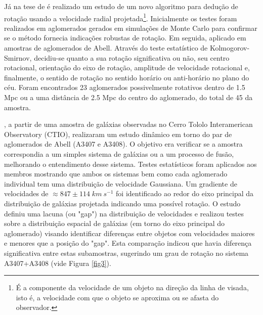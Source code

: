 Já na tese de  é realizado um estudo de um novo algoritmo para dedução de rotação usando a velocidade radial projetada\footnote{É a componente da velocidade de um objeto na direção da linha de visada, isto é, a velocidade com que o objeto se aproxima ou se afasta do observador.}. Inicialmente os testes foram realizados em aglomerados gerados em simulações de Monte Carlo para confirmar se o método fornecia indicações robustas de rotação. Em seguida, aplicado em amostras de aglomerados de Abell. Através do teste estatístico de Kolmogorov-Smirnov, decidiu-se quanto a sua rotação significativa ou não, seu centro rotacional, orientação do eixo de rotação, amplitude de velocidade rotacional e, finalmente, o sentido de rotação no sentido horário ou anti-horário no plano do céu. Foram encontrados 23 aglomerados possivelmente rotativos dentro de 1.5 Mpc ou a uma distância de 2.5 Mpc do centro do aglomerado, do total de 45 da amostra.

, a partir de uma amostra de galáxias observadas no Cerro Tololo Interamerican Observatory (CTIO), realizaram um estudo dinâmico em torno do par de aglomerados de Abell (A3407 e A3408). O objetivo era verificar se a amostra correspondia a um simples sistema de galáxias ou a um processo de fusão, melhorando o entendimento desse sistema. Testes estatísticos foram aplicados aos membros mostrando que ambos os sistemas bem como cada aglomerado individual tem uma distribuição de velocidade Gaussiana. Um gradiente de velocidades de $\approx 847 \pm 114\; {km~s^{-1}}$ foi identificado ao redor do eixo principal da distribuição de galáxias projetada indicando uma possível rotação. 
O estudo definiu uma lacuna (ou "gap") na distribuição de velocidades e realizou testes sobre a distribuição espacial de galáxias (em torno do eixo principal do aglomerado) visando identificar diferenças entre objetos com velocidades maiores e menores que a posição do "gap". Esta comparação indicou que havia diferença significativa entre estas subamostras, sugerindo um grau de rotação no sistema A3407+A3408 (vide Figura \ref{fig3}).

